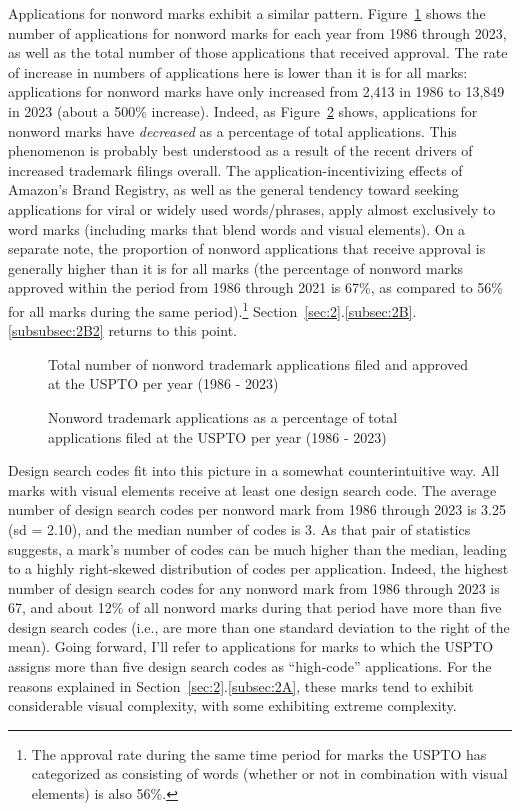 \documentclass[letterpaper, 11pt, oneside]{article}
\begin{document}
Applications for nonword marks exhibit a similar pattern. Figure~\ref{fig:2} shows the number of applications for nonword marks for each year from 1986 through 2023, as well as the total number of those applications that received approval. The rate of increase in numbers of applications here is lower than it is for all marks: applications for nonword marks have only increased from 2,413 in 1986 to 13,849 in 2023 (about a 500\% increase). Indeed, as Figure~\ref{fig:3} shows, applications for nonword marks have \emph{decreased} as a percentage of total applications. This phenomenon is probably best understood as a result of the recent drivers of increased trademark filings overall. The application-incentivizing effects of Amazon's Brand Registry, as well as the general tendency toward seeking applications for viral or widely used words/phrases, apply almost exclusively to word marks (including marks that blend words and visual elements). On a separate note, the proportion of nonword applications that receive approval is generally higher than it is for all marks (the percentage of nonword marks approved within the period from 1986 through 2021 is 67\%, as compared to 56\% for all marks during the same period).\footnote{The approval rate during the same time period for marks the USPTO has categorized as consisting of words (whether or not in combination with visual elements) is also 56\%.} Section~\ref{sec:2}.\ref{subsec:2B}.\ref{subsubsec:2B2} returns to this point.

\begin{figure}[H]
\centering

\caption{\label{fig:2} Total number of nonword trademark applications filed and approved at the USPTO per year (1986 - 2023)}
\end{figure}

\begin{figure}[H]
\centering

\caption{\label{fig:3} Nonword trademark applications as a percentage of total applications filed at the USPTO per year (1986 - 2023)}
\end{figure}

Design search codes fit into this picture in a somewhat counterintuitive way. All marks with visual elements receive at least one design search code. The average number of design search codes per nonword mark from 1986 through 2023 is 3.25 (sd = 2.10), and the median number of codes is 3. As that pair of statistics suggests, a mark's number of codes can be much higher than the median, leading to a highly right-skewed distribution of codes per application. Indeed, the highest number of design search codes for any nonword mark from 1986 through 2023 is 67, and about 12\% of all nonword marks during that period have more than five design search codes (i.e., are more than one standard deviation to the right of the mean). Going forward, I'll refer to applications for marks to which the USPTO assigns more than five design search codes as ``high-code'' applications. For the reasons explained in Section~\ref{sec:2}.\ref{subsec:2A}, these marks tend to exhibit considerable visual complexity, with some exhibiting extreme complexity.
\end{document}
